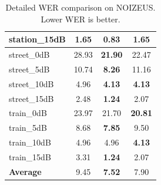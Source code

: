 \documentclass{llmxive}
\begin{document}
\begin{table}[t]
{\begin{tabular}{lccc}
station\_15dB & 1.65 & \textbf{0.83} & 1.65 \\
\midrule
street\_0dB & 28.93 & \textbf{21.90} & 22.47 \\
street\_5dB & 10.74 & \textbf{8.26} & 11.16 \\
street\_10dB & 4.96 & \textbf{4.13} & \textbf{4.13} \\
street\_15dB & 2.48 & \textbf{1.24} & 2.07 \\
\midrule
train\_0dB & 23.97 & 21.70 & \textbf{20.81} \\
train\_5dB & 8.68 & \textbf{7.85} & 9.50 \\
train\_10dB & 4.96 & 4.96 & \textbf{4.13} \\
train\_15dB & 3.31 & \textbf{1.24} & 2.07 \\
\midrule
\textbf{Average} & 9.45 & \textbf{7.52} & 7.90 \\
\bottomrule
\end{tabular}
}
\vspace{-2mm}
\caption{
Detailed WER comparison on NOIZEUS. Lower WER is better.
}
\end{table}
\end{document}
